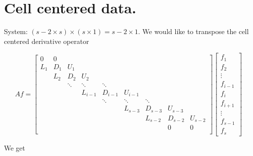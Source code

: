 \documentclass[11pt]{article}
\begin{document}
\doublespacing
\MOONSTITLE

\section{Cell centered data.}
System: $(s-2 \times s) \times (s \times 1) = s-2 \times 1$. We would like to transpose the cell centered derivative operator

\[ Af = \left[
\begin{array}{ccccccccc}
0 & 0    &       &           &           &           &       &         & \\
L_{1} & D_{1}    & U_{1}     &           &           &           &       &         & \\
      & L_{2} & D_{2}    & U_{2}     &           &           &           &         & \\
      &       & \ddots   & \ddots    & \ddots    &           &           &         & \\
      &       &          & L_{i-1}   & D_{i-1}   & U_{i-1}   &           &         & \\
      &       &          &           & \ddots    & \ddots    & \ddots    &         & \\
      &       &          &           &           & L_{s-3}   & D_{s-3}   & U_{s-3} & \\
      &      &       &          &           &           & L_{s-2}   & D_{s-2}   & U_{s-2} \\
  &      &       &           &           &           &       &      0  & 0 \\
\end{array} \right]
\left[ \begin{array}{c}
f_{1} \\ f_{2} \\ \vdots \\ f_{i-1} \\ f_{i} \\ f_{i+1} \\ \vdots \\ f_{s-1} \\ f_{s}
\end{array} \right]
\]

We get
\end{document}
